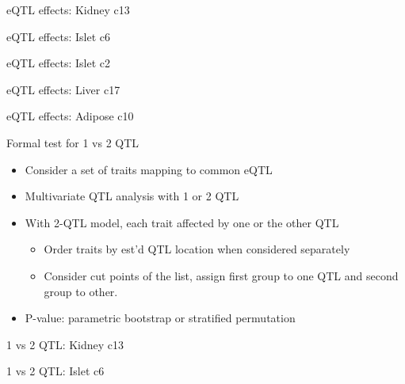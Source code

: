 \documentclass[12pt,t]{beamer}
\begin{document}
\begin{frame}[c]{eQTL effects: Kidney c13}
\end{frame}

\begin{frame}[c]{eQTL effects: Islet c6}
\end{frame}

\begin{frame}[c]{eQTL effects: Islet c2}
\end{frame}

\begin{frame}[c]{eQTL effects: Liver c17}
\end{frame}

\begin{frame}[c]{eQTL effects: Adipose c10}
\end{frame}


\begin{frame}[c]{Formal test for 1 vs 2 QTL}

  \begin{itemize}
  \itemsep12pt
  \item Consider a set of traits mapping to common eQTL
  \item Multivariate QTL analysis with 1 or 2 QTL
  \item With 2-QTL model, each trait affected by one or the other QTL
    \vspace*{8pt}
    \begin{itemize}
      \itemsep8pt
      \item Order traits by est'd QTL location when considered
        separately
      \item Consider cut points of the list, assign first group to one
        QTL and second group to other.
    \end{itemize}
  \item P-value: parametric bootstrap or stratified permutation
  \end{itemize}

\end{frame}


\begin{frame}[c]{1 vs 2 QTL: Kidney c13}
\end{frame}

\begin{frame}[c]{1 vs 2 QTL: Islet c6}
\end{frame}
\end{document}
